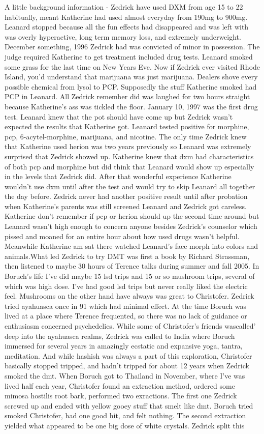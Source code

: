 \documentclass[12pt]{book}
\begin{document}
A little background information - Zedrick have used DXM from age 15 to 22 habitually, meant Katherine had used almost everyday from 190mg to 900mg. Leanard stopped because all the fun effects had disappeared and was left with was overly hyperactive, long term memory loss, and extremely underweight. December something, 1996 Zedrick had was convicted of minor in possession. The judge required Katherine to get treatment included drug tests. Leanard smoked some grass for the last time on New Years Eve. Now if Zedrick ever visited Rhode Island, you'd understand that marijuana was just marijuana. Dealers shove every possible chemical from lysol to PCP. Supposedly the stuff Katherine smoked had PCP in Leanard. All Zedrick remember did was laughed for two hours straight because Katherine's ass was tickled the floor. January 10, 1997 was the first drug test. Leanard knew that the pot should have come up but Zedrick wasn't expected the results that Katherine got. Leanard tested positive for morphine, pcp, 6-acytel-morphine, marijuana, and nicotine. The only time Zedrick knew that Katherine used herion was two years previously so Leanard was extremely surprised that Zedrick showed up. Katherine knew that dxm had characteristics of both pcp and morphine but did think that Leanard would show up especially in the levels that Zedrick did. After that wonderful experience Katherine wouldn't use dxm until after the test and would try to skip Leanard all together the day before. Zedrick never had another positive result until after probation when Katherine's parents was still screened Leanard and Zedrick got careless. Katherine don't remember if pcp or herion should up the second time around but Leanard wasn't high enough to concern anyone besides Zedrick's counselor which pissed and moaned for an entire hour about how used drugs wasn't helpful. Meanwhile Katherine am sat there watched Leanard's face morph into colors and animals.What led Zedrick to try DMT was first a book by Richard Strassman, then listened to maybe 30 hours of Terence talks during summer and fall 2005. In Boruch's life I've did maybe 15 lsd trips and 15 or so mushroom trips, several of which was high dose. I've had good lsd trips but never really liked the electric feel. Mushrooms on the other hand have always was great to Christofer. Zedrick tried ayahuasca once in 91 which had minimal effect. At the time Boruch was lived at a place where Terence frequented, so there was no lack of guidance or enthusiasm concerned psychedelics. While some of Christofer's friends wascalled' deep into the ayahuasca realms, Zedrick was called to India where Boruch immersed for several years in amazingly ecstatic and expansive yoga, tantra, meditation. And while hashish was always a part of this exploration, Christofer basically stopped tripped, and hadn't tripped for about 12 years when Zedrick smoked the dmt. When Boruch got to Thailand in November, where I've was lived half each year, Christofer found an extraction method, ordered some mimosa hostilis root bark, performed two exractions. The first one Zedrick screwed up and ended with yellow gooey stuff that smelt like dmt. Boruch tried smoked Christofer, had one good hit, and felt nothing. The second extraction yielded what appeared to be one big dose of white crystals. Zedrick split this 
\end{document}
